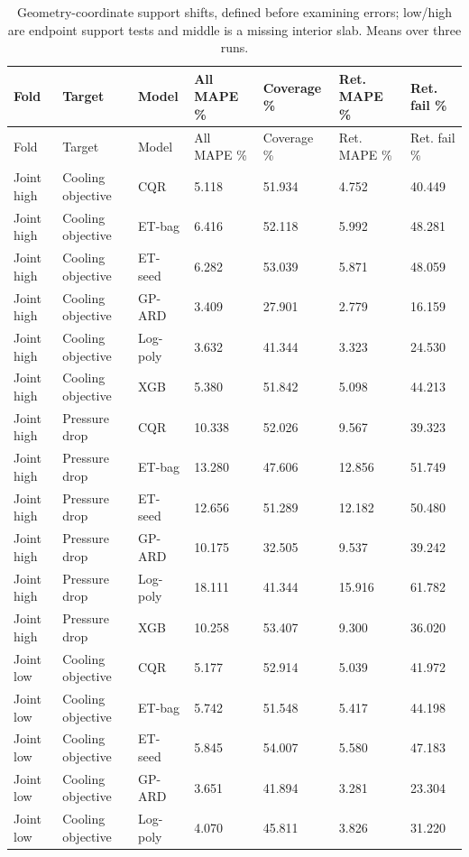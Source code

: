 \begingroup\small\setlength{\tabcolsep}{3pt}\begin{longtable}{lllllll}
\caption{Geometry-coordinate support shifts, defined before examining errors; low/high are endpoint support tests and middle is a missing interior slab. Means over three runs.}\label{tab:ubend-structured}\\\toprule
Fold & Target & Model & All MAPE \% & Coverage \% & Ret. MAPE \% & Ret. fail \%\\\midrule
\endfirsthead\toprule
Fold & Target & Model & All MAPE \% & Coverage \% & Ret. MAPE \% & Ret. fail \%\\\midrule
\endhead
Joint high & Cooling objective & CQR & 5.118 & 51.934 & 4.752 & 40.449\\
Joint high & Cooling objective & ET-bag & 6.416 & 52.118 & 5.992 & 48.281\\
Joint high & Cooling objective & ET-seed & 6.282 & 53.039 & 5.871 & 48.059\\
Joint high & Cooling objective & GP-ARD & 3.409 & 27.901 & 2.779 & 16.159\\
Joint high & Cooling objective & Log-poly & 3.632 & 41.344 & 3.323 & 24.530\\
Joint high & Cooling objective & XGB & 5.380 & 51.842 & 5.098 & 44.213\\
Joint high & Pressure drop & CQR & 10.338 & 52.026 & 9.567 & 39.323\\
Joint high & Pressure drop & ET-bag & 13.280 & 47.606 & 12.856 & 51.749\\
Joint high & Pressure drop & ET-seed & 12.656 & 51.289 & 12.182 & 50.480\\
Joint high & Pressure drop & GP-ARD & 10.175 & 32.505 & 9.537 & 39.242\\
Joint high & Pressure drop & Log-poly & 18.111 & 41.344 & 15.916 & 61.782\\
Joint high & Pressure drop & XGB & 10.258 & 53.407 & 9.300 & 36.020\\
Joint low & Cooling objective & CQR & 5.177 & 52.914 & 5.039 & 41.972\\
Joint low & Cooling objective & ET-bag & 5.742 & 51.548 & 5.417 & 44.198\\
Joint low & Cooling objective & ET-seed & 5.845 & 54.007 & 5.580 & 47.183\\
Joint low & Cooling objective & GP-ARD & 3.651 & 41.894 & 3.281 & 23.304\\
Joint low & Cooling objective & Log-poly & 4.070 & 45.811 & 3.826 & 31.220\\

\end{longtable}
